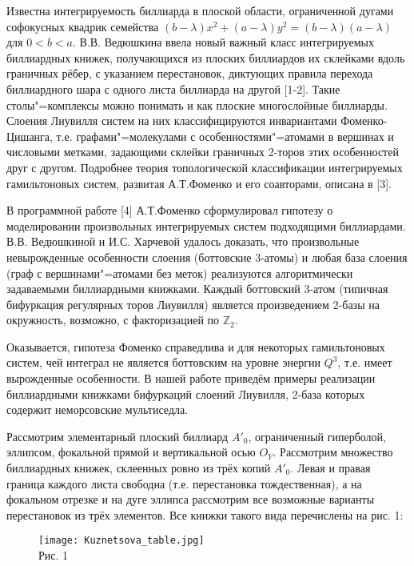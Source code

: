 
\vzmscaption


Известна интегрируемость биллиарда в плоской области, ограниченной дугами софокусных квадрик семейства $(b-\lambda)x^2+(a-\lambda)y^2=(b-\lambda)(a-\lambda)$ для $0<b<a$. В.В. Ведюшкина ввела новый важный класс интегрируемых биллиардных книжек, получающихся из плоских биллиардов их склейками вдоль граничных рёбер, с указанием перестановок, диктующих правила перехода биллиардного шара с одного листа биллиарда на другой [1-2]. Такие столы"=комплексы можно понимать и как плоские многослойные биллиарды. Слоения Лиувилля систем на них классифицируются инвариантами Фоменко-Цишанга, т.е. графами"=молекулами с особенностями"=атомами в вершинах и числовыми метками, задающими склейки граничных 2-торов этих особенностей друг с другом. Подробнее теория топологической классификации интегрируемых гамильтоновых систем, развитая А.Т.Фоменко и его соавторами, описана в [3].

В программной работе [4] А.Т.Фоменко сформулировал гипотезу о моделировании произвольных интегрируемых систем подходящими биллиардами. В.В. Ведюшкиной и И.С. Харчевой удалось доказать, что произвольные невырожденные особенности слоения (боттовские 3-атомы) и любая база слоения (граф с вершинами"=атомами без меток) реализуются алгоритмически задаваемыми биллиардными книжками. Каждый боттовский 3-атом (типичная бифуркация регулярных торов Лиувилля) является произведением 2-базы на окружность, возможно, с факторизацией по $\mathbb{Z}_2$.

Оказывается, гипотеза Фоменко справедлива и для некоторых гамильтоновых систем, чей интеграл не является боттовским на уровне энергии $Q^3$, т.е. имеет вырожденные особенности. В нашей работе приведём примеры реализации биллиардными книжками бифуркаций слоений Лиувилля, 2-база которых содержит неморсовские мультиседла.

Рассмотрим элементарный плоский биллиард $A'_{0}$, ограниченный гиперболой, эллипсом, фокальной прямой и вертикальной осью $O_{Y}$.
Рассмотрим множество биллиардных книжек, склеенных ровно из трёх копий $A'_{0}$. Левая и правая граница каждого листа свободна (т.е. перестановка тождественная), а на фокальном отрезке и на дуге эллипса рассмотрим все возможные варианты перестановок из трёх элементов. Все книжки такого вида перечислены на рис. 1:
\vspace*{-0.4cm}
\begin{figure}[h!]
	\begin{center}
	\texttt{[image: Kuznetsova\_table.jpg]}\\
	Рис. 1
	\end{center}
\end{figure}
\vspace*{-1.1cm}\\

